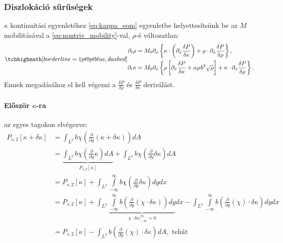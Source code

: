 \documentclass[10pt,a4paper]{scrartcl}
\begin{document}
\subsubsection{Diszlokáció sűrűségek} $\kappa$ kontinuitási egyenletéhez \cref{eq:kappa_eom} egyenletbe helyettesítsünk be az $M$ mobilitásával a \cref{eq:nontriv_mobility}-val, $\rho$-é változatlan:
\begin{gather} \label{eq:rho_kappa_conti}
\tcbhighmath[borderline={1pt}{0pt}{blue,dashed}]{
\begin{aligned}{\partial _t}\rho  &  = {M_0}{\partial _x}\left\{ {\kappa \cdot \left( {{\partial _x}\frac{{\delta P}}{{\delta \kappa }}} \right) + \rho \cdot {\partial _x}\frac{{\delta P}}{{\delta \rho }}} \right\}, \\ 
  {\partial _t}\kappa  &  = {M_0}{\partial _x}\left\{ {\rho \left[ {{\partial _x}\frac{{\delta P}}{{\delta \kappa }} + \alpha \mu {b^2}\sqrt \rho } \right] + \kappa  \cdot {\partial _x}\frac{{\delta P}}{{\delta \rho }}} \right\}.
\end{aligned}}
\end{gather}
Ennek megadásához el kell végezni a $\frac{{\delta P}}{{\delta \rho }}$ és $\frac{{\delta P}}{{\delta \kappa }}$ deriválást.\paragraph{Először $\kappa$-ra} az egyes tagokon elvégezve:
\begin{align*}
  {P_{s,2}}\left[ {\kappa  + \delta \kappa } \right] &  = \int_{{L^2}} {b\chi \left( {\frac{\partial }{{\partial y}}\left( {\kappa  + \delta \kappa } \right)} \right)dA}  \\ 
   &  = \underbrace {\int_{{L^2}} {b\chi \left( {\frac{\partial }{{\partial y}}\kappa } \right)dA} }_{{P_{s,2}}\left[ \kappa  \right]} + \int_{{L^2}} {b\chi \left( {\frac{\partial }{{\partial y}}\delta \kappa } \right)dA}  \\ 
   &  = {P_{s,2}}\left[ \kappa  \right] + \int_{{L^2}} {\int\limits_{ - \infty }^\infty  {b\chi \left( {\frac{\partial }{{\partial y}}\delta \kappa } \right)} dy} dx \\ 
   &  = {P_{s,2}}\left[ \kappa  \right] + \int_{{L^2}} {\underbrace {\int\limits_{ - \infty }^\infty  {b\left( {\frac{\partial }{{\partial y}}\left( {\chi  \cdot \delta \kappa } \right)} \right)} dy}_{\left. {\chi  \cdot \delta \kappa } \right|_{ - \infty }^\infty  = 0}} dx - \int_{{L^2}} {\int\limits_{ - \infty }^\infty  {b\left( {\frac{\partial }{{\partial y}}\left( \chi  \right) \cdot \delta \kappa } \right)dy} dx}  \\ 
   &  = {P_{s,2}}\left[ \kappa  \right] - \int_{{L^2}} {b\left( {\frac{\partial }{{\partial y}}\left( \chi  \right) \cdot \delta \kappa } \right)dA}, \text{ tehát}
\end{align*}
\end{document}
